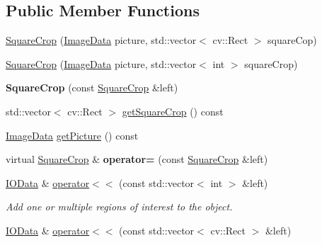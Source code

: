 \subsection*{Public Member Functions}
\begin{DoxyCompactItemize}
\item 
\hyperlink{classfilter_1_1data_1_1_square_crop_a66d0d5077685230e0749532539e0461e}{Square\+Crop} (\hyperlink{classfilter_1_1data_1_1_image_data}{Image\+Data} picture, std\+::vector$<$ cv\+::\+Rect $>$ square\+Cop)
\item 
\hyperlink{classfilter_1_1data_1_1_square_crop_af1b851ed583e9c5fff2fc8021d289584}{Square\+Crop} (\hyperlink{classfilter_1_1data_1_1_image_data}{Image\+Data} picture, std\+::vector$<$ int $>$ square\+Crop)
\item 
\mbox{\label{classfilter_1_1data_1_1_square_crop_ae4a956a412d9e6da42ca92fa2e03446c}} 
{\bfseries Square\+Crop} (const \hyperlink{classfilter_1_1data_1_1_square_crop}{Square\+Crop} \&left)
\item 
std\+::vector$<$ cv\+::\+Rect $>$ \hyperlink{classfilter_1_1data_1_1_square_crop_ac0a29b6c8ac9a87cb14c8a19a89eb359}{get\+Square\+Crop} () const
\item 
\hyperlink{classfilter_1_1data_1_1_image_data}{Image\+Data} \hyperlink{classfilter_1_1data_1_1_square_crop_a97b9cd82a00fb0d4a314f95010726344}{get\+Picture} () const
\item 
\mbox{\label{classfilter_1_1data_1_1_square_crop_ac214a1d5f138d55f97e6d380c9d5a766}} 
virtual \hyperlink{classfilter_1_1data_1_1_square_crop}{Square\+Crop} \& {\bfseries operator=} (const \hyperlink{classfilter_1_1data_1_1_square_crop}{Square\+Crop} \&left)
\item 
\hyperlink{classfilter_1_1data_1_1_i_o_data}{I\+O\+Data} \& \hyperlink{classfilter_1_1data_1_1_square_crop_a8a0a3376eebb769ac09bd31a9bf12113}{operator$<$$<$} (const std\+::vector$<$ int $>$ \&left)
\begin{DoxyCompactList}\small\item\em Add one or multiple regions of interest to the object. \end{DoxyCompactList}\item 
\hyperlink{classfilter_1_1data_1_1_i_o_data}{I\+O\+Data} \& \hyperlink{classfilter_1_1data_1_1_square_crop_a8c860c4f607cd352f102345e103d2d2a}{operator$<$$<$} (const std\+::vector$<$ cv\+::\+Rect $>$ \&left)

\end{DoxyCompactItemize}

